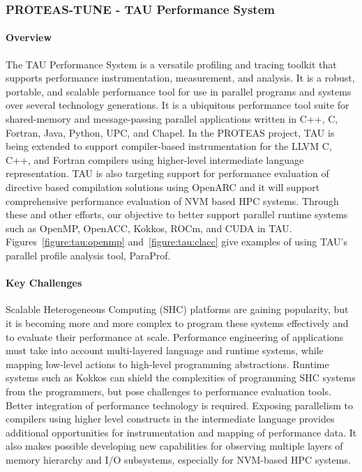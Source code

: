 \subsubsection{ PROTEAS-TUNE - TAU Performance System}\label{subsubsect:tau}

\paragraph{Overview} 
The TAU Performance System is a versatile profiling and tracing toolkit that supports performance instrumentation, measurement, and analysis. It is a robust, portable, and scalable performance tool for use in parallel programs and systems over several technology generations. It is a ubiquitous performance tool suite for shared-memory and message-passing parallel applications written in C++, C, Fortran, Java, Python, UPC, and Chapel. In the PROTEAS project, TAU is being extended to support compiler-based instrumentation for the LLVM C, C++, and Fortran compilers using higher-level intermediate language representation. TAU is also targeting support for performance evaluation of directive based compilation solutions using OpenARC and it will support comprehensive performance evaluation of NVM based HPC systems.  Through these and other efforts, our objective to better support parallel runtime systems such as OpenMP, OpenACC, Kokkos, ROCm, and CUDA in TAU. Figures~\ref{figure:tau:openmp} and~\ref{figure:tau:clacc} give  examples of using TAU's parallel profile analysis tool, ParaProf.

\paragraph{Key Challenges} 
Scalable Heterogeneous Computing (SHC) platforms are gaining popularity, but it is becoming more and more complex to program these systems effectively and to evaluate their performance at scale. Performance engineering of applications must take into account multi-layered language and runtime systems, while mapping low-level actions to high-level programming abstractions.  Runtime systems such as Kokkos can shield the complexities of programming SHC systems from the programmers, but pose challenges to performance evaluation tools.  Better integration of performance technology is required.  Exposing parallelism to compilers using higher level constructs in the intermediate language provides additional opportunities for instrumentation and mapping of performance data.  It also makes possible developing new capabilities for observing multiple layers of memory hierarchy and I/O subsystems, especially for NVM-based HPC systems. 

